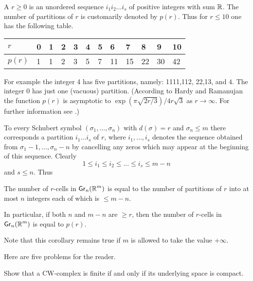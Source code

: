 \begin{definition}\label{def:6-7}
A  $r \geq 0$ is an unordered sequence $i_{1} i_{2} \dots i_{s}$ of positive integers with sum $\boldsymbol{\mathbb{R}}$. The number of partitions of $r$ is customarily denoted by $p(r) $. Thus for $r \leq 10$ one has the following table.

\begin{table}[!h]
\centering\begin{tabular}{|l|lllllllllll|}
	\hline
	$r$ & 0 & 1 & 2 & 3 & 4 & 5 & 6 & 7 & 8 & 9 & 10 \\
	\hline
	$p(r)$ & 1 & 1 & 2 & 3 & 5 & 7 & 11 & 15 & 22 & 30 & 42 \\
	\hline
\end{tabular}
\end{table}	
\end{definition}

For example the integer 4 has five partitions, namely: 1111,112, 22,13, and $4 .$ The integer 0 has just one (vacuous) partition. (According to Hardy and Ramanujan the function $p(r)$ is asymptotic to $\exp (\pi \sqrt{2 r / 3}) / 4 r \sqrt{3}$ as $r\rightarrow \infty$. For further information see \cite{74}.)

To every Schubert symbol $(\sigma_{1},\dots, \sigma_{n})$ with $d(\sigma)=r$ and $\sigma_{n} \leq m$ there corresponds a partition $i_{1}\dots i_{s}$ of $r$, where $i_{1},\dots, i_{s}$ denotes the sequence obtained from $\sigma_{1}-1,\dots, \sigma_{n}-n$ by cancelling any zeros which may appear at the beginning of this sequence. Clearly
\[
1 \leq i_{1} \leq i_{2} \leq\dots \leq i_{s} \leq m-n
\]
and $s \leq n $. Thus

\begin{corollary}\label{cor-6-7}
The number of $r$-cells in $\grass{n}{m}$ is equal to the number of partitions of $r$ into at most $n$ integers each of which is $\leq m-n$.	
\end{corollary}
 In particular, if both $n$ and $m-n$ are $\geq r$, then the number of $r$-cells in $\grass{n}{m}$ is equal to $p(r)$.

Note that this corollary remains true if $m$ is allowed to take the value $+\infty$.

Here are five problems for the reader.

\begin{problem}\label{prob-6-A}
	Show that a CW-complex is finite if and only if its underlying space is compact.
\end{problem}


